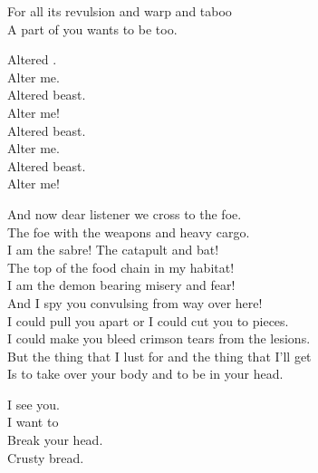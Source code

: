 
For all its revulsion and warp and taboo \\
A part of you wants to be  too. \\


Altered . \\
Alter me. \\
Altered beast. \\
Alter me! \\

Altered beast. \\
Alter me. \\
Altered beast. \\
Alter me! \\





And now dear listener we cross to the foe. \\
The foe with the weapons and heavy cargo. \\

I am the sabre! The catapult and bat! \\
The top of the food chain in my habitat! \\

I am the demon bearing misery and fear! \\
And I spy you convulsing from way over here! \\

I could pull you apart or I could cut you to pieces. \\
I could make you bleed crimson tears from the lesions. \\

But the thing that I lust for and the thing that I'll get \\
Is to take over your body and to be in your head. \\


I see you. \\
I want to \\
Break your head. \\
Crusty bread. \\


